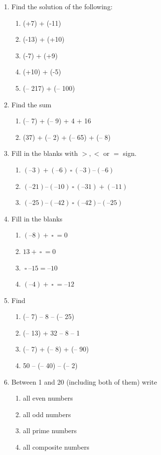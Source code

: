 \documentclass[a4paper,leqno,12pt]{amsart}
\begin{document}
\begin{enumerate}
\item Find the solution of the following:
\begin{enumerate}
\item (+7) + (-11)
\item (-13) + (+10)
\item (-7) + (+9)
\item (+10) + (-5)
\item (– 217) + (– 100)
\end{enumerate}

\item Find the sum
\begin{enumerate}
\item (– 7) + (– 9) + 4 + 16
\item (37) + (– 2) + (– 65) + (– 8)
\end{enumerate}

\item Fill in the blanks with $>, <$ or $=$ sign.
\begin{enumerate}
\item $(– 3) + (– 6)  \ \square \  (– 3) – (– 6)$
\item $(– 21) – (– 10)  \ \square \  (– 31) + (– 11)$
\item $(– 25) – (– 42) \ \square \ (– 42) – (– 25)$
\end{enumerate}

\item Fill in the blanks
\begin{enumerate}
\item $(– 8) + \ \square \ = 0$
\item $13 + \ \square \ = 0$
\item $\ \square \ – 15 = – 10$
\item $(– 4) + \ \square \ = – 12$
\end{enumerate}

\item Find
\begin{enumerate}
\item (– 7) – 8 – (– 25)
\item (– 13) + 32 – 8 – 1
\item (– 7) + (– 8) + (– 90)
\item 50 – (– 40) – (– 2)
\end{enumerate}

\item Between 1 and 20 (including both of them) write 
\begin{enumerate}
 \item all even numbers
 \item all odd numbers
 \item all prime numbers
 \item all composite numbers
\end{enumerate}


\end{enumerate}
\end{document}
